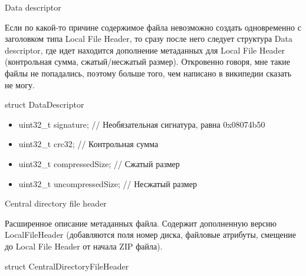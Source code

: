 Data descriptor

Если по какой-то причине содержимое файла невозможно создать одновременно с заголовком типа Local File Header, то сразу после него следует структура Data descriptor, где идет находится дополнение метаданных для Local File Header (контрольная сумма, сжатый/несжатый размер). Откровенно говоря, мне такие файлы не попадались, поэтому больше того, чем написано в википедии сказать не могу.

struct DataDescriptor

\begin{itemize}
\item    uint32\_t signature;		// Необязательная сигнатура, равна 0x08074b50
\item    uint32\_t crc32;			// Контрольная сумма
\item    uint32\_t compressedSize;	// Сжатый размер
\item    uint32\_t uncompressedSize;	 // Несжатый размер
\end{itemize}

Central directory file header

Расширенное описание метаданных файла. Содержит дополненную версию LocalFileHeader (добавляются поля номер диска, файловые атрибуты, смещение до Local File Header от начала ZIP файла).

struct CentralDirectoryFileHeader


